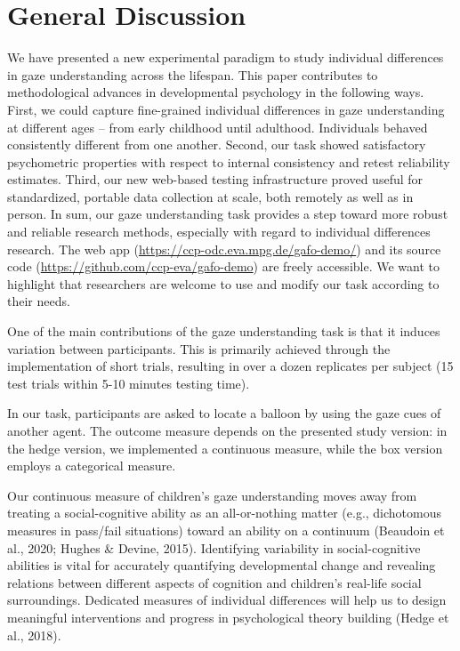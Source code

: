 \documentclass[
  man,floatsintext]{apa6}
\begin{document}
\hypertarget{general-discussion}{%
\section{General Discussion}\label{general-discussion}}

We have presented a new experimental paradigm to study individual differences in gaze understanding across the lifespan.
This paper contributes to methodological advances in developmental psychology in the following ways.
First, we could capture fine-grained individual differences in gaze understanding at different ages -- from early childhood until adulthood.
Individuals behaved consistently different from one another.
Second, our task showed satisfactory psychometric properties with respect to internal consistency and retest reliability estimates.
Third, our new web-based testing infrastructure proved useful for standardized, portable data collection at scale, both remotely as well as in person.
In sum, our gaze understanding task provides a step toward more robust and reliable research methods, especially with regard to individual differences research.
The web app (\url{https://ccp-odc.eva.mpg.de/gafo-demo/}) and its source code (\url{https://github.com/ccp-eva/gafo-demo}) are freely accessible.
We want to highlight that researchers are welcome to use and modify our task according to their needs.

One of the main contributions of the gaze understanding task is that it induces variation between participants.
This is primarily achieved through the implementation of short trials, resulting in over a dozen replicates per subject (15 test trials within 5-10 minutes testing time).

In our task, participants are asked to locate a balloon by using the gaze cues of another agent.
The outcome measure depends on the presented study version: in the hedge version, we implemented a continuous measure, while the box version employs a categorical measure.

Our continuous measure of children's gaze understanding moves away from treating a social-cognitive ability as an all-or-nothing matter (e.g., dichotomous measures in pass/fail situations) toward an ability on a continuum (Beaudoin et al., 2020; Hughes \& Devine, 2015).
Identifying variability in social-cognitive abilities is vital for accurately quantifying developmental change and revealing relations between different aspects of cognition and children's real-life social surroundings.
Dedicated measures of individual differences will help us to design meaningful interventions and progress in psychological theory building (Hedge et al., 2018).
\end{document}
